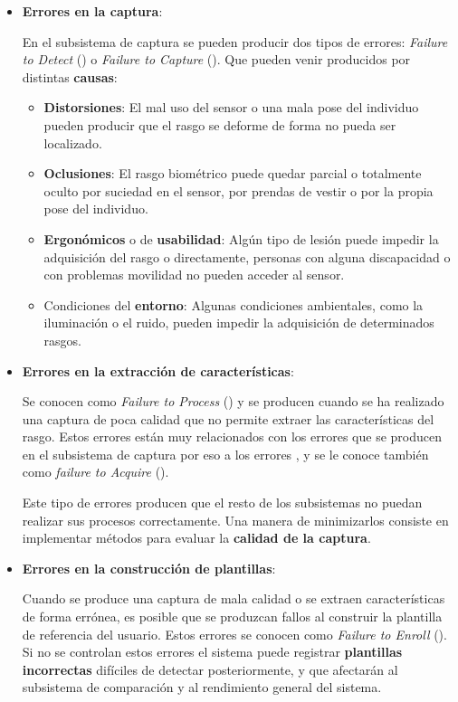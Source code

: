 \begin{itemize}
    \item 
    \textbf{Errores en la captura}:
    
    En el subsistema de captura se pueden producir dos tipos de errores: \textit{Failure to Detect} (\textbf{}) o \textit{Failure to Capture} (\textbf{}). Que pueden venir producidos por distintas \textbf{causas}:
    \begin{itemize}
    \item 
    \textbf{Distorsiones}: El mal uso del sensor o una mala pose del individuo pueden producir que el rasgo se deforme de forma no pueda ser localizado. 
    \item 
    \textbf{Oclusiones}: El rasgo biométrico puede quedar parcial o totalmente oculto por suciedad en el sensor, por prendas de vestir o por la propia pose del individuo.
    \item 
    \textbf{Ergonómicos} o de \textbf{usabilidad}: Algún tipo de lesión puede impedir la adquisición del rasgo o directamente, personas con alguna discapacidad o con problemas movilidad no pueden acceder al sensor. 
    \item 
    Condiciones del \textbf{entorno}: Algunas condiciones ambientales, como la iluminación o el ruido, pueden impedir la adquisición de determinados rasgos. 
    \end{itemize}
    
    \item 
    \textbf{Errores en la extracción de características}:
    
    Se conocen como \textit{Failure to Process} (\textbf{}) y se producen cuando se ha realizado una captura de poca calidad que no permite extraer las características del rasgo. Estos errores están muy relacionados con los errores que se producen en el subsistema de captura por eso a los errores ,  y  se le conoce también como \textit{failure to Acquire} (\textbf{}).
    
    Este tipo de errores producen que el resto de los subsistemas no puedan realizar sus procesos correctamente. Una manera de minimizarlos consiste en implementar métodos para evaluar la \textbf{calidad de la captura}. 
    
    \item 
    \textbf{Errores en la construcción de plantillas}:
    
    Cuando se produce una captura de mala calidad o se extraen características de forma errónea, es posible que se produzcan fallos al construir la plantilla de referencia del usuario. Estos errores se conocen como \textit{Failure to Enroll} (\textbf{}). Si no se controlan estos errores el sistema puede registrar \textbf{plantillas incorrectas} difíciles de detectar posteriormente, y que afectarán al subsistema de comparación y al rendimiento general del sistema.  
    

\end{itemize}
